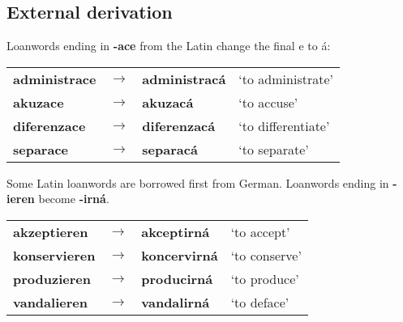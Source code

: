 \subsection{External derivation}
\par Loanwords ending in \textbf{-ace} from the Latin change the final e to á:
\begin{table}[h!]
	\centering \small
	\begin{tabu} to 0.9
		administrace 	& $\rightarrow$ & administracá 	& `to administrate' \\
		akuzace			& $\rightarrow$ & akuzacá		& `to accuse'\\
		diferenzace		& $\rightarrow$ & diferenzacá	& `to differentiate'\\
		separace		& $\rightarrow$ & separacá		& `to separate'\\
	\end{tabu}
\end{table}
\par Some Latin loanwords are borrowed first from German. Loanwords ending in \textbf{-ieren} become \textbf{-irná}.
\begin{table}[h!]
	\centering \small
	\begin{tabu} to 0.9
		akzeptieren 	& $\rightarrow$ & akceptirná 	& `to accept' \\
		konservieren	& $\rightarrow$ & koncervirná	& `to conserve'\\
		produzieren		& $\rightarrow$ & producirná	& `to produce'\\
		vandalieren		& $\rightarrow$ & vandalirná 	& `to deface'\\
	\end{tabu}
\end{table}
